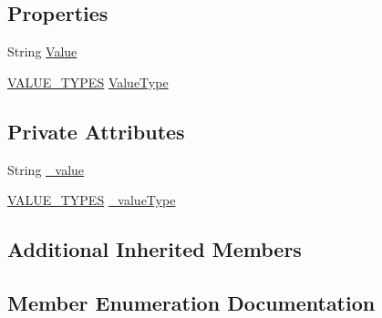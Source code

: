 \subsection*{Properties}
\begin{DoxyCompactItemize}
\item 
String \hyperlink{class_web_analyzer_1_1_models_1_1_settings_model_1_1_expression_tree_1_1_value_node_abc4f8ff5dd972ce1c49f135273797926}{Value}
\item 
\hyperlink{class_web_analyzer_1_1_models_1_1_settings_model_1_1_expression_tree_1_1_value_node_ac18254d82bd6e0d754ed1a2484882d11}{V\+A\+L\+U\+E\+\_\+\+T\+Y\+P\+E\+S} \hyperlink{class_web_analyzer_1_1_models_1_1_settings_model_1_1_expression_tree_1_1_value_node_aa1c55c593ae80ac78221c1397ede5ab2}{Value\+Type}
\end{DoxyCompactItemize}
\subsection*{Private Attributes}
\begin{DoxyCompactItemize}
\item 
String \hyperlink{class_web_analyzer_1_1_models_1_1_settings_model_1_1_expression_tree_1_1_value_node_a2a3fb6174add907e160cef8eb0088d1c}{\+\_\+value}
\item 
\hyperlink{class_web_analyzer_1_1_models_1_1_settings_model_1_1_expression_tree_1_1_value_node_ac18254d82bd6e0d754ed1a2484882d11}{V\+A\+L\+U\+E\+\_\+\+T\+Y\+P\+E\+S} \hyperlink{class_web_analyzer_1_1_models_1_1_settings_model_1_1_expression_tree_1_1_value_node_a79b9df583576bec1fd1916ffb8613642}{\+\_\+value\+Type}
\end{DoxyCompactItemize}
\subsection*{Additional Inherited Members}


\subsection{Member Enumeration Documentation}
\hypertarget{class_web_analyzer_1_1_models_1_1_settings_model_1_1_expression_tree_1_1_value_node_ac18254d82bd6e0d754ed1a2484882d11}{}
